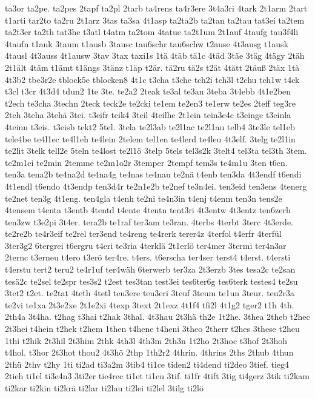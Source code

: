 {ta3or
ta2pe.
ta2pes
2tapf
ta2pl
2tarb
ta4rens
ta4r3ere
3t4a3ri
4tark
2t1arm
2tart
t1arti
tar2to
ta2ru
2t1arz
3tas
ta3sa
4t1asp
ta2ta2b
ta2tan
ta2tau
tat3ei
ta2tem
ta2t3er
ta2th
tat3he
t3atl
t4atm
ta2tom
4tatue
ta2t1um
2t1auf
4taufg
tau3f4li
4taufn
t1auk
3taum
t1ausb
3tausc
tau6schr
tau6schw
t2ause
4t3ausg
t1ausk
4tausl
4t3auss
4t1ausw
3tav
3tax
taxi1s
1tä
4täb
tä1c
4täd
3täe
3täg
4tägy
2täh
2t1ält
4täm
t1ämt
t1ängs
3tänz
t1äp
t2är.
tä2ru
tä2s
t2ät
4tätt
2täuß
2täx
1tà
4t3b2
tbe3r2e
tblock5e
tblocken8
4t1c
t3cha
t3che
tch2i
tch3l
t2chu
tch1w
t4ck
t3cl
t3cr
4t3d4
tdun2
1te
3te.
te2a2
2teak
te3al
te3an
3teba
3t4ebb
4t1e2ben
t2ech
te3cha
3techn
2teck
teck2e
te2cki
te1em
te2en3
te1erw
te2es
2teff
teg3re
2teh
3teha
3tehä
3tei.
t3eifr
teik4
3teil
4teilhe
2t1ein
tein3e4c
t3einge
t3einla
4teinn
t3eis.
t3eisb
tekt2
5tel.
3tela
te2l3ab
te2l1ac
te2l1au
telb4
3te3le
tel1eb
tele4be
te4l1ec
te4l1eh
te4lein
2telem
tel1en
te4lerd
te4leu
4t3elf.
3telg
te2l1in
te2lit
3telk
tell2e
5teln
te4lost
te2l1ö
3telp
5tels
tel3s2k
3telt4
tel3ta
tel3th
3tem.
te2m1ei
te2min
2temme
te2m1o2r
3temper
2tempf
tem3s
te4m1u
3ten
t6en.
ten3a
tena2b
te4na2d
te4na4g
te4nas
te4nau
te2nä
t4enb
ten3da
4t3endf
t6endi
4t1endl
t6endo
4t3endp
ten3d4r
te2n1e2b
te2nef
te3n4ei.
ten3eid
ten3ens
4tenerg
te2net
ten3g
4t1eng.
ten4gla
t4enh
te2ni
te4n3in
t4enj
t4enm
ten3n
tens2e
4tensem
t4enta
t3entb
4tentd
t4ente
4tentn
tent3ri
4t3entw
4t3entz
ten6zerh
ten3zw
t3e2pi
3t4er.
tera2b
te1raf
ter3am
te3ran.
4terbs
4terbt
3terc
4t3erde.
te2re2b
te4r3eif
te2rel
ter3end
te4reng
te4rerk
terer4z
4terfol
t4erfr
4terfül
3ter3g2
6tergrei
t6ergru
t4eri
te3ria
4terklä
2t1erlö
ter4mer
3termi
ter4n3ar
2ternc
t3erneu
t4ero
t3erö
ter4re.
t4ers.
t6erscha
ter4ser
terst4
t4erst.
t4ersti
t4erstu
tert2
teru2
te4r1uf
ter4wäh
6terwerb
ter3za
2t3erzb
3tes
tesa2c
te2san
tesä2c
te2sel
te2spr
tes3s2
t2est
tes3tan
test3ei
tes6ter6g
tes6terk
testes4
te2su
3tet2
t2et.
te2tat
4teth
4tetl
teu3ere
teu3eri
3teuf
3teum
te1un
3teur.
teu2r3a
te2vi
te1xa
2t3e2xe
2t1e2xi
4texp
3text
2t1exz
4t1f4
tfi2l
4t1g2
tger2
t1h
4th.
2th4a
3t4ha.
t2hag
t3hai
t2hak
3thal.
4t3hau
2t3hä
th2e
1t2he.
3thea
2theb
t2hec
2t3hei
t4hein
t2hek
t2hem
1then
t4hene
t4heni
3theo
2therr
t2hes
3these
t2heu
1thi
t2hik
2t3hil
2t3him
2thk
4th3l
4th3m
2th3n
1t2ho
2t3hoc
t3hof
2t3hoh
t4hol.
t3hor
2t3hot
thou2
4t3hö
2thp
1th2r2
4thrin.
4thrins
2ths
2thub
4thun
2thü
2thv
t2hy
1ti
ti2ad
ti3a2m
3tib4
ti1ce
tiden2
ti4dend
ti2deo
3tief.
tieg4
2tieh
ti1el
ti3e4n3
3ti2er
tie4rec
ti1et
ti1eu
3tif.
ti1fr
4tift
3tig
ti4gerz
3tik
ti2kam
ti2kar
ti2kin
ti2krä
ti2lar
ti2lau
ti2lei
ti2lel
3tilg
ti2lö
}
